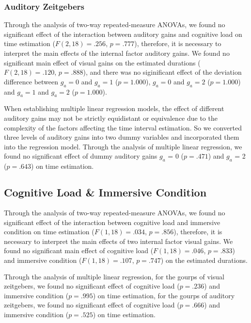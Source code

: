 \documentclass[sigconf]{acmart}
\begin{document}
\subsubsection{Auditory Zeitgebers}

Through the analysis of two-way repeated-measure ANOVAs, we found no significant effect of the interaction between auditory gains and cognitive load on time estimation ($F(2,18) = .256$, $p = .777$), therefore, it is necessary to interpret the main effects of the internal factor auditory gains. We found no significant main effect of visual gains on the estimated durations ($F(2,18) = .120$, $p = .888$), and there was no siginificant effect of the deviation difference between $g_a = 0$ and $g_a = 1$ ($p = 1.000$), $g_a = 0$ and $g_a = 2$ ($p = 1.000$) and $g_a = 1$ and $g_a = 2$ ($p = 1.000$).

When establishing multiple linear regression models, the effect of different auditory gains may not be strictly equidistant or equivalence due to the complexity of the factors affecting the time interval estimation. So we converted three levels of auditory gains into two dummy variables and incorporated them into the regression model. Through the analysis of multiple linear regression, we found no significant effect of dummy auditory gains $g_a$ = 0 ($p = .471$) and $g_a$ = 2 ($p = .643$) on time estimation.

\subsection*{Cognitive Load \& Immersive Condition}

Through the analysis of two-way repeated-measure ANOVAs, we found no significant effect of the interaction between cognitive load  and immersive condition on time estimation ($F(1,18) = .034$, $p = .856$), therefore, it is necessary to interpret the main effects of two internal factor visual gains. We found no significant main effect of cognitive load ($F(1,18) = .046$, $p = .833$) and immersive condition ($F(1,18) = .107$, $p = .747$) on the estimated durations.

Through the analysis of multiple linear regression, for the gourps of visual zeitgebers, we found no significant effect of cognitive load ($p = .236$) and immersive condition ($p = .995$) on time estimation, for the gourps of auditory zeitgebers, we found no significant effect of cognitive load ($p = .666$) and immersive condition ($p = .525$) on time estimation.
\end{document}
